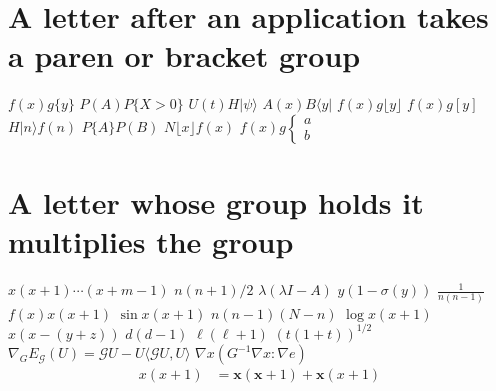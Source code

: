 \documentclass{article}
\begin{document}
\section{A letter after an application takes a paren or bracket group}
$f(x)g\{y\}$ $P(A)P\{X>0\}$ $U(t)H|\psi\rangle$ $A(x)B\langle y|$ $f(x)g\lfloor y\rfloor$ $f(x)g[y]$
$H|n\rangle f(n)$ $P\{A\}P(B)$ $N\lfloor x\rfloor f(x)$
$f(x)g\left\{\begin{array}{l}a\\b\end{array}\right.$

\section{A letter whose group holds it multiplies the group}
$x(x+1)\cdots(x+m-1)$ $n(n+1)/2$ $\lambda(\lambda I-A)$ $y(1-\sigma(y))$ $\frac{1}{n(n-1)}$ $f(x)x(x+1)$
$\sin x(x+1)$ $n(n-1)(N-n)$ $\log x(x+1)$ $x(x-(y+z))$ $d(d-1)$ $\ell(\ell+1)$ $(t(1+t))^{1/2}$
$\nabla_{G}E_{\mathcal{G}}(U)=\mathcal{G}U-U\langle\mathcal{G}U,U\rangle$ $\nabla x(G^{-1}\nabla x:\nabla e)$
\begin{equation}\begin{split}x(x+1)&=\mathbf{x}(\mathbf{x}+1)+\mathbf{x}(x+1)\end{split}\end{equation}

\end{document}
